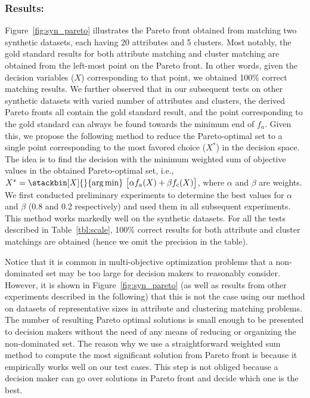 \subsubsection{Results:}
Figure~\ref{fig:syn_pareto} illustrates the Pareto front obtained from matching two synthetic datasets, each having 20 attributes and 5 clusters. Most notably, the gold standard results for both attribute matching and cluster matching are obtained from the left-most point on the Pareto front. In other words, given the decision variables ($X$) corresponding to that point, we obtained 100\% correct matching results. We further observed that in our subsequent tests on other synthetic datasets with varied number of attributes and clusters, the derived Pareto fronts all contain the gold standard result, and the point corresponding to the gold standard can always be found towards the minimum end of $f_a$. Given this, we propose the following method to reduce the Pareto-optimal set to a single point corresponding to the most favored choice ($X^*$) in the decision space. The idea is to find the decision with the minimum weighted sum of objective values in the obtained Pareto-optimal set, i.e., $X^*=\stackbin[X]{}{\argmin}~\big[\alpha f_a(X)+\beta f_c(X)\big]$, where $\alpha$ and $\beta$ are weights. We first conducted preliminary experiments to determine the best values for $\alpha$ and $\beta$ (0.8 and 0.2 respectively) and used them in all subsequent experiments. This method works markedly well on the synthetic datasets. For all the tests described in Table~\ref{tbl:scale}, 100\% correct results for both attribute and cluster matchings are obtained (hence we omit the precision in the table).

Notice that it is common in multi-objective optimization problems that a non-dominated set may be too large for decision makers to reasonably consider. However, it is shown in Figure~\ref{fig:syn_pareto} (as well as results from other experiments described in the following) that this is not the case using our method on datasets of representative sizes in attribute and clustering matching problems. The number of resulting Pareto optimal solutions is small enough to be presented to decision makers without the need of any means of reducing or organizing the non-dominated set. The reason why we use a straightforward weighted sum method to compute the most significant solution from Pareto front is because it empirically works well on our test cases. This step is not obliged because a decision maker can go over solutions in Pareto front and decide which one is the best.

